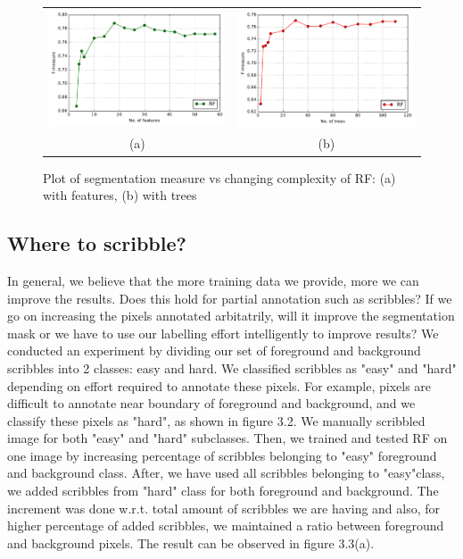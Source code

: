 \begin{figure}[h!] \label{fig:rf_complex}
\begin{tabular}{cc}
 \includegraphics[width=0.45\linewidth]{figures/diff_features.pdf} & \includegraphics[width=0.55\linewidth]{figures/diff_trees.pdf} \\
  (a)  & (b) \\
\end{tabular}
\caption{Plot of segmentation measure vs changing complexity of RF: (a) with features, (b) with trees}
\end{figure}


\subsection{Where to scribble?}
In general, we believe that the more training data we provide, more we can improve the results. Does this hold for partial annotation such as scribbles? If we go on increasing the pixels annotated arbitatrily, will it improve the segmentation mask or we have to use our labelling effort intelligently to improve results? We conducted an experiment by dividing our set of foreground and background scribbles into 2 classes: easy and hard. We classified scribbles as "easy" and "hard" depending on effort required to annotate these pixels. For example, pixels are difficult to annotate near boundary of foreground and background, and we classify these pixels as "hard", as shown in figure 3.2. We manually scribbled image for both "easy" and "hard" subclasses. Then, we trained and tested RF on one image by increasing percentage of scribbles belonging to "easy" foreground and background class. After, we have used all scribbles belonging to "easy"class, we added scribbles from "hard" class for both foreground and background. The increment was done w.r.t. total amount of scribbles we are having and also, for higher percentage of added scribbles, we maintained a ratio between foreground and background pixels. The result can be observed in figure 3.3(a). \par

